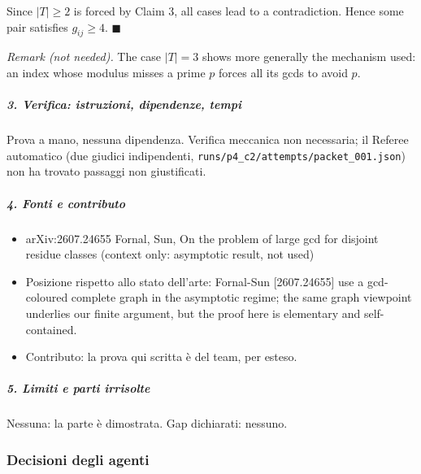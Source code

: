 \documentclass[11pt,a4paper]{article}
\providecommand{\tightlist}{\setlength{\itemsep}{0pt}\setlength{\parskip}{0pt}}
\begin{document}
Since \(|T|\ge2\) is forced by Claim 3, all cases lead to a
contradiction. Hence some pair satisfies \(g_{ij}\ge4\).
\(\blacksquare\)

\emph{Remark (not needed).} The case \(|T|=3\) shows more generally the
mechanism used: an index whose modulus misses a prime \(p\) forces all
its gcds to avoid \(p\).

\subparagraph{3. Verifica: istruzioni, dipendenze,
tempi}\label{verifica-istruzioni-dipendenze-tempi}

Prova a mano, nessuna dipendenza. Verifica meccanica non necessaria; il
Referee automatico (due giudici indipendenti,
\texttt{runs/p4\_c2/attempts/packet\_001.json}) non ha trovato passaggi
non giustificati.

\subparagraph{4. Fonti e contributo}\label{fonti-e-contributo}

\begin{itemize}
\tightlist
\item
  arXiv:2607.24655 Fornal, Sun, On the problem of large gcd for disjoint
  residue classes (context only: asymptotic result, not used)
\item
  Posizione rispetto allo stato dell'arte: Fornal-Sun {[}2607.24655{]}
  use a gcd-coloured complete graph in the asymptotic regime; the same
  graph viewpoint underlies our finite argument, but the proof here is
  elementary and self-contained.
\item
  Contributo: la prova qui scritta è del team, per esteso.
\end{itemize}

\subparagraph{5. Limiti e parti
irrisolte}\label{limiti-e-parti-irrisolte}

Nessuna: la parte è dimostrata. Gap dichiarati: nessuno.

\subsubsection{Decisioni degli agenti}
\end{document}
